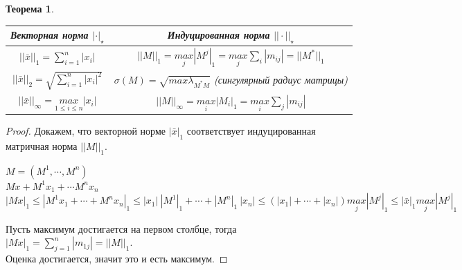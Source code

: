 \documentclass[12pt]{article}
\newtheorem*{theorem}{Теорема}
\begin{document}
	\begin{theorem}
		\ 
	\begin{center}
		\begin{tabular}{ | c || c |}
			\hline
			Векторная норма $|\cdot|_{\star}$ & Индуцированная норма $||\cdot||_{\star}$\\ \hline \hline
			$||\bar x||_1 = \sum\limits_{i=1}^n |x_i|$ & $||M||_1 = \underset{j}{max}|M^j|_1=\underset{j}{max}\sum\limits_i|m_{ij}|=||M^*||_1$  \\ \hline \hline
			$||\bar x||_2  = \sqrt{\sum\limits_{i=1}^n |x_i|^2}$ & $\sigma(M)=\sqrt{max \lambda_{M^*M}}$ (сингулярный радиус матрицы) \\
			\hline \hline
			$||\bar x||_\infty = \underset{1\leq i \leq n}{max} |x_i|$ & $||M||_{\infty} = \underset{i}{max}|M_i|_1=\underset{i}{max}\sum\limits_j|m_{ij}|$ \\ \hline
		\end{tabular}
	\end{center}
	\end{theorem}
	\begin{proof}
	Докажем, что векторной норме $|\bar x|_1$ соответствует индуцированная матричная норма $||M||_1$.\\
	\begin{center} $M=(M^1,\cdots, M^n)$\\
		$Mx+M^1x_1+\cdots M^nx_n$\\
		$|Mx|_1\leqslant |M^1x_1+\cdots+M^nx_n|_1\leqslant|x_1|~|M^1|_1+\cdots+|M^n|_1~|x_n|\leqslant(|x_1|+\cdots+|x_n|)\underset{j}{max}|M^j|_1\leqslant|\bar x|_1\underset{j}{max}|M^j|_1$\end{center}
	Пусть максимум достигается на первом столбце, тогда $|Mx|_1=\sum\limits_{j=1}^n|m_{1j}|=||M||_1$.\\
	Оценка достигается, значит это и есть максимум.
	\end{proof}
\end{document}

